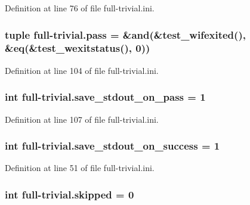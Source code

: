 Definition at line 76 of file full-\/trivial.\-ini.

\hypertarget{namespacefull-trivial_a47d8fbeff54aeee0210d2f5d55d4fc75}{
\subsubsection[{pass}]{\setlength{\rightskip}{0pt plus 5cm}tuple full-\/trivial.\-pass = \&and(\&test\-\_\-wifexited(), \&eq(\&test\-\_\-wexitstatus(), 0))}}\label{namespacefull-trivial_a47d8fbeff54aeee0210d2f5d55d4fc75}


Definition at line 104 of file full-\/trivial.\-ini.

\hypertarget{namespacefull-trivial_a648cfc9aa4be2d29a9b2cc7fa66a99de}{
\subsubsection[{save\-\_\-stdout\-\_\-on\-\_\-pass}]{\setlength{\rightskip}{0pt plus 5cm}int full-\/trivial.\-save\-\_\-stdout\-\_\-on\-\_\-pass = 1}}\label{namespacefull-trivial_a648cfc9aa4be2d29a9b2cc7fa66a99de}


Definition at line 107 of file full-\/trivial.\-ini.

\hypertarget{namespacefull-trivial_aa9f5860b95aa3cfb3deaa3cf840b5615}{
\subsubsection[{save\-\_\-stdout\-\_\-on\-\_\-success}]{\setlength{\rightskip}{0pt plus 5cm}int full-\/trivial.\-save\-\_\-stdout\-\_\-on\-\_\-success = 1}}\label{namespacefull-trivial_aa9f5860b95aa3cfb3deaa3cf840b5615}


Definition at line 51 of file full-\/trivial.\-ini.

\hypertarget{namespacefull-trivial_a119af101bc6d9cb4061ffea6b4187230}{
\subsubsection[{skipped}]{\setlength{\rightskip}{0pt plus 5cm}int full-\/trivial.\-skipped = 0}}\label{namespacefull-trivial_a119af101bc6d9cb4061ffea6b4187230}


